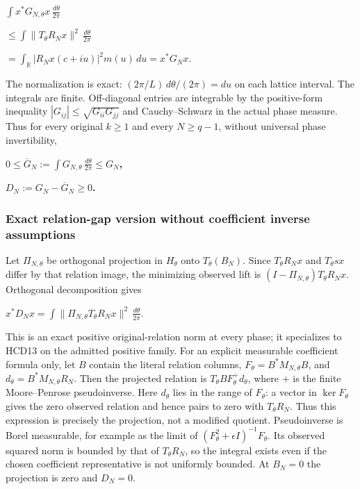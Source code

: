 \(\int x^*G_{N,\theta}x\,\frac{d\theta}{2\pi}\)

\(\le\int\|T_\theta R_Nx\|^2\,\frac{d\theta}{2\pi}\)

\(=\int_{\mathbb R}|R_Nx(c+iu)|^2m(u)\,du=x^*G_Nx\).

The normalization is exact: \((2\pi/L)\,d\theta/(2\pi)=du\) on each lattice interval. The integrals are finite. Off-diagonal entries are integrable by the positive-form inequality \(|G_{ij}|\le\sqrt{G_{ii}G_{jj}}\) and Cauchy--Schwarz in the actual phase measure. Thus for every original \(k\ge1\) and every \(N\ge q-1\), without universal phase invertibility,

\textbf{\(0\le\overline G_N:=\int G_{N,\theta}\,\frac{d\theta}{2\pi}\le G_N\),}

\textbf{\(D_N:=G_N-\overline G_N\ge0\).}

\subsubsection{Exact relation-gap version without coefficient inverse assumptions}\label{exact-relation-gap-version-without-coefficient-inverse-assumptions}

Let \(\Pi_{N,\theta}\) be orthogonal projection in \(H_\theta\) onto \(T_\theta(B_N)\). Since \(T_\theta R_Nx\) and \(T_\theta sx\) differ by that relation image, the minimizing observed lift is \((I-\Pi_{N,\theta})T_\theta R_Nx\). Orthogonal decomposition gives

\(x^*D_Nx=\int\|\Pi_{N,\theta}T_\theta R_Nx\|^2\,\frac{d\theta}{2\pi}\).

This is an exact positive original-relation norm at every phase; it specializes to HCD13 on the admitted positive family. For an explicit measurable coefficient formula only, let \(B\) contain the literal relation columns, \(F_\theta=B^*M_{N,\theta}B\), and \(d_\theta=B^*M_{N,\theta}R_N\). Then the projected relation is \(T_\theta BF_\theta^+d_\theta\), where \(+\) is the finite Moore--Penrose pseudoinverse. Here \(d_\theta\) lies in the range of \(F_\theta\): a vector in \(\ker F_\theta\) gives the zero observed relation and hence pairs to zero with \(T_\theta R_N\). Thus this expression is precisely the projection, not a modified quotient. Pseudoinverse is Borel measurable, for example as the limit of \((F_\theta^2+\epsilon I)^{-1}F_\theta\). Its observed squared norm is bounded by that of \(T_\theta R_N\), so the integral exists even if the chosen coefficient representative is not uniformly bounded. At \(B_N=0\) the projection is zero and \(D_N=0\).

